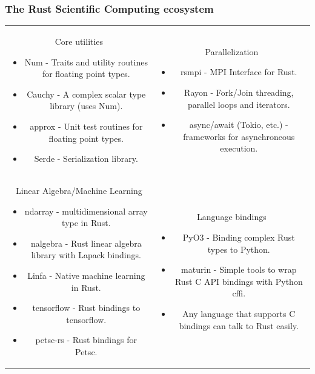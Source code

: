 \documentclass[dvipsnames,10pt]{beamer}
\begin{document}
\begin{frame}
\frametitle{The Rust Scientific Computing ecosystem}

{\tiny

\begin{tabular}{cc}
\begin{minipage}[t]{5cm}
{\color{blue} Core utilities}
\begin{itemize}
\item Num - Traits and utility routines for floating point types.
\item Cauchy - A complex scalar type library (uses Num).
\item approx - Unit test routines for floating point types.
\item Serde - Serialization library.
\end{itemize}
\end{minipage} & 
\begin{minipage}[t]{5cm}
{\color{blue}Parallelization}
\begin{itemize}
\item rsmpi - MPI Interface for Rust.
\item Rayon - Fork/Join threading, parallel loops and iterators.
\item async/await (Tokio, etc.) - frameworks for asynchroneous execution.
\end{itemize}
\end{minipage}\\
\begin{minipage}[t]{5cm}
{\color{blue} Linear Algebra/Machine Learning}
\begin{itemize}
\item ndarray - multidimensional array type in Rust.
\item nalgebra - Rust linear algebra library with Lapack bindings.
\item Linfa - Native machine learning in Rust.
\item tensorflow - Rust bindings to tensorflow.
\item petsc-rs - Rust bindings for Petsc.
\end{itemize}
\end{minipage} &
\begin{minipage}[t]{5cm}
{\color{blue} Language bindings}
\begin{itemize}
\item PyO3 - Binding complex Rust types to Python.
\item maturin - Simple tools to wrap Rust C API bindings with Python cffi.
\item Any language that supports C bindings can talk to Rust easily.
\end{itemize}
\end{minipage}


\end{tabular}}
\end{frame}
\end{document}
